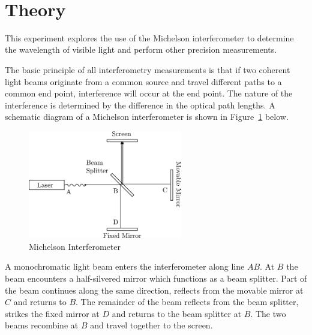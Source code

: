 \documentclass{tufte-handout}
\begin{document}



\vspace{0.5cm}
\\
\vspace{0.5cm}

\section{Theory}

This experiment explores the use of the Michelson interferometer to
determine the wavelength of visible light and perform other precision
measurements.

The basic principle of all interferometry measurements is that 
if two coherent light beams originate from a common source and 
travel different paths to a common end point, interference will 
occur at the end point. The nature of the interference is determined 
by the difference in the optical path lengths. A schematic diagram 
of a Michelson interferometer is shown in Figure~\ref{schematic} below.

\begin{figure}[htbp]
\begin{center}
\includegraphics[width=0.6\textwidth]{../images/inter.png}
\caption{Michelson Interferometer }
\label{schematic}
\end{center}
\end{figure}

A monochromatic light beam enters the interferometer along line $AB$. At
$B$ the beam encounters a half-silvered mirror which functions as a beam
splitter. Part of the beam continues along the same direction, reflects
from the movable mirror at $C$ and returns to $B$. The remainder of the beam
reflects from the beam splitter, strikes the fixed mirror at $D$ and
returns to the beam splitter at $B$. The two beams recombine at $B$ and
travel together to the screen. 
\end{document}
